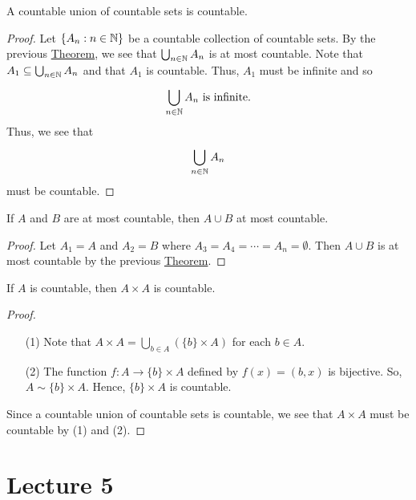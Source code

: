 \documentclass[a4paper]{report}
\begin{document}
\begin{corollary}
A countable union of countable sets is countable.    
\end{corollary}
\begin{proof}
Let \( \{ {A}_{n} : n \in \mathbb{N}  \}  \) be a countable collection of countable sets. By the previous {\hyperref[Countable union of at most countable sets is at most countable]{Theorem}}, we see that \( \bigcup_{ n \in \mathbb{N}  }^{   }  {A}_{n} \) is at most countable. Note that \( {A}_{1} \subseteq \bigcup_{ n \in \mathbb{N}  }^{   } {A}_{n} \) and that \( {A}_{1} \) is countable. Thus, \( {A}_{1} \) must be infinite and so 
\[  \bigcup_{ n \in \mathbb{N}  }^{} {A}_{n}  \ \text{is infinite}. \]
Thus, we see that 
\[  \bigcup_{ n \in \mathbb{N}  }^{  } {A}_{n}  \]
must be countable.
\end{proof}

\begin{corollary}
   If \( A  \) and \( B  \) are at most countable, then \( A \cup B  \) at most countable. 
\end{corollary}
\begin{proof}
Let \( {A}_{1} = A  \) and \( {A}_{2} = B  \) where \( {A}_{3} = {A}_{4} = \cdots = {A}_{n} = \emptyset \). Then \( A \cup B  \) is at most countable by the previous {\hyperref[Countable union of at most countable sets is at most countable]{Theorem}}. 
\end{proof}

\begin{theorem}[ ]
    If \( A  \) is countable, then \( A \times A  \) is countable.
\end{theorem}
\begin{proof}
    \begin{enumerate}
        \item[(1)] Note that \( A \times A  = \bigcup_{ b \in A  }^{  }  (\{ b  \}  \times A)  \) for each \( b \in A  \).
        \item[(2)] The function \( f: A \to \{ b \}  \times A  \) defined by \( f(x) = (b,x) \) is bijective. So, \( A \sim \{ b \}  \times A  \). Hence, \( \{ b  \}  \times A  \) is countable.
    \end{enumerate}
    Since a countable union of countable sets is countable, we see that \( A \times A  \) must be countable by (1) and (2).
\end{proof}




\section{Lecture 5}
\end{document}
